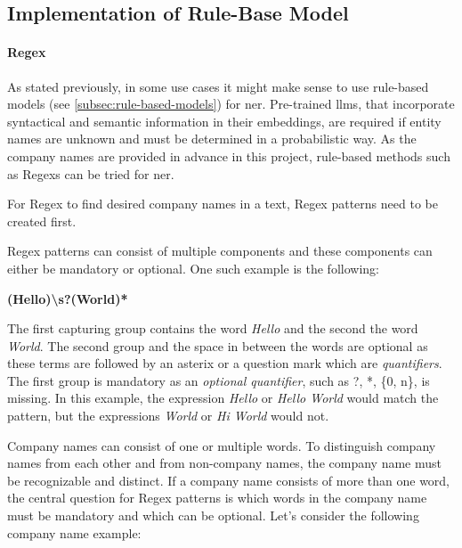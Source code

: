 
\subsection{Implementation of Rule-Base Model}
\paragraph{\gls{Regex}}
As stated previously, in some use cases it might make sense to use rule-based models (see \ref{subsec:rule-based-models}) for \gls{ner}.
Pre-trained \glspl{llm}, that incorporate syntactical and semantic information in their embeddings, are required if entity names are unknown and must be determined in a probabilistic way.
As the company names are provided in advance in this project, rule-based methods such as \glspl{Regex} can be tried for \gls{ner}.

For \gls{Regex} to find desired company names in a text, \gls{Regex} patterns need to be created first.

\gls{Regex} patterns can consist of multiple components and these components can either be mandatory or optional.
One such example is the following:

\begin{center}
\textbf{(Hello)\textbackslash s?(World)*}
\end{center}

The first capturing group contains the word \textit{Hello} and the second the word \textit{World}.
The second group and the space in between the words are optional as these terms are followed by an asterix or a question mark which are \emph{quantifiers}.
The first group is mandatory as an \emph{optional quantifier}, such as ?, *, \{0, n\}, is missing.
In this example, the expression \emph{Hello} or \emph{Hello World} would match the pattern, but the expressions \emph{World} or \emph{Hi World} would not.

Company names can consist of one or multiple words.
To distinguish company names from each other and from non-company names, the company name must be recognizable and distinct.
If a company name consists of more than one word, the central question for \gls{Regex} patterns is which words in the company name must be mandatory and which can be optional.
Let’s consider the following company name example:

